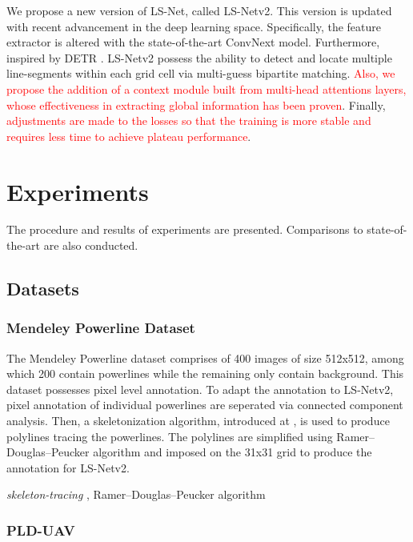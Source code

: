 \documentclass[journal]{IEEEtran}
\begin{document}
We propose a new version of LS-Net, called LS-Netv2. This version is updated with recent advancement in the deep learning space. Specifically, the feature extractor is altered with the state-of-the-art ConvNext model. Furthermore, inspired by DETR \cite{DETR}. LS-Netv2 possess the ability to detect and locate multiple line-segments within each grid cell via multi-guess bipartite matching.  \textcolor{red}{Also, we propose the addition of a context module built from multi-head attentions layers, whose effectiveness in extracting global information has been proven}. Finally, \textcolor{red}{adjustments are made to the losses so that the training is more stable and requires less time to achieve plateau performance}.

\section{Experiments}
The procedure and results of experiments are presented. Comparisons to state-of-the-art are also conducted.
\subsection{Datasets}
\subsubsection{ Mendeley Powerline Dataset}
The Mendeley Powerline dataset comprises of 400 images of size 512x512, among which 200 contain powerlines while the remaining only contain background. This dataset possesses pixel level annotation. To adapt the annotation to LS-Netv2, pixel annotation of individual powerlines are seperated via connected component analysis. Then, a skeletonization algorithm, introduced at \cite{skeleton}, is used to produce polylines tracing the powerlines. The polylines are simplified using Ramer–Douglas–Peucker algorithm \cite{RDP} and imposed on the 31x31 grid to produce the annotation for LS-Netv2.

\emph{skeleton-tracing} \cite{skeleton}, Ramer–Douglas–Peucker algorithm \cite{RDP}
\subsubsection{PLD-UAV}
\end{document}
